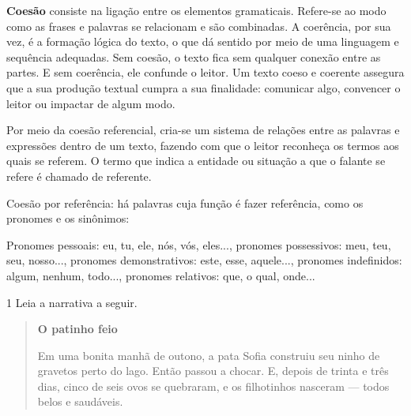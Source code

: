 \begin{escolha}
{\textbf{Coesão} consiste na ligação entre os elementos gramaticais.
Refere-se ao modo como as frases e palavras se relacionam e são
combinadas. A coerência, por sua vez, é a formação lógica do texto, o
que dá sentido por meio de uma linguagem e sequência adequadas. Sem
coesão, o texto fica sem qualquer conexão entre as partes. E sem
coerência, ele confunde o leitor. Um texto coeso e coerente assegura que
a sua produção textual cumpra a sua finalidade: comunicar algo,
convencer o leitor ou impactar de algum modo.

Por meio da coesão referencial, cria-se um sistema de relações entre as
palavras e expressões dentro de um texto, fazendo com que o leitor
reconheça os termos aos quais se referem. O termo que indica a entidade
ou situação a que o falante se refere é chamado de referente.

Coesão por referência: há palavras cuja função é fazer referência, como
os pronomes e os sinônimos:

Pronomes pessoais: eu, tu, ele, nós, vós, eles..., pronomes possessivos:
meu, teu, seu, nosso..., pronomes demonstrativos: este, esse, aquele...,
pronomes indefinidos: algum, nenhum, todo..., pronomes relativos: que, o
qual, onde...
}


\num{1} Leia a narrativa a seguir.



\begin{quote}
\textbf{O patinho feio}

Em uma bonita manhã de outono, a pata Sofia construiu seu ninho de
gravetos perto do lago. Então passou a chocar. E, depois de trinta e
três dias, cinco de seis ovos se quebraram, e os filhotinhos nasceram
--- todos belos e saudáveis.


\end{quote}
\end{escolha}
